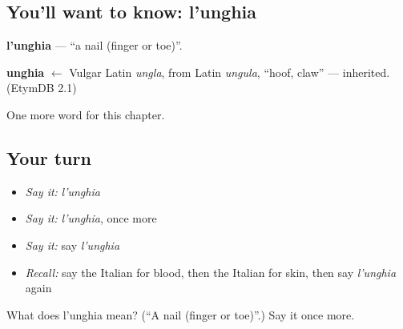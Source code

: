 \subsection*{You'll want to know: l'unghia}
\textbf{l'unghia} — \textquotedblleft{}a nail (finger or toe)\textquotedblright{}.

\begin{cousinweb}
\textbf{unghia} $\leftarrow$ Vulgar Latin \emph{ungla}, from Latin \emph{ungula}, \textquotedblleft{}hoof, claw\textquotedblright{} — inherited. (EtymDB 2.1)
\end{cousinweb}

\begin{grammarlens}[title={What you've built}]
One more word for this chapter.
\end{grammarlens}

\subsection*{Your turn}
\begin{itemize}
\raggedright
  \item \emph{Say it:} \emph{l'unghia}
  \item \emph{Say it:} \emph{l'unghia}, once more
  \item \emph{Say it:} say \emph{l'unghia}
  \item \emph{Recall:} say the Italian for blood, then the Italian for skin, then say \emph{l'unghia} again
\end{itemize}

\begin{tcolorbox}[breakable,colback=teal!4,colframe=teal!35!black,title={Before you move on}]
What does l'unghia mean? (\textquotedblleft{}A nail (finger or toe)\textquotedblright{}.) Say it once more.
\end{tcolorbox}
